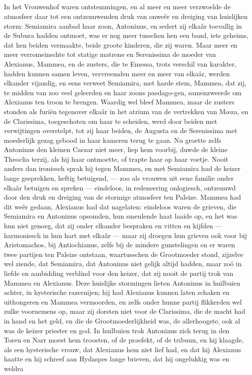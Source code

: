 \documentclass[a4paper, 12pt, oneside, dutch]{article}
\begin{document}
\subsection{}
\paragraph{}
In het Vrouwenhof waren ontstemmingen, en al meer en meer verzwoelde de atmosfeer daar tot een ontzenuwenden druk van onweêr en dreiging van huislijken storm: Semiamira aanbad haar zoon, Antoninus, en sedert zij elkaâr toevallig in de Subura hadden ontmoet, was er nog meer tusschen hen een band, iets geheims, dat hen beiden vermaakte, beide groote kinderen, die zij waren. Maar meer en meer verromeinschte tot statige matrone en Serenissima de moeder van Alexianus, Mammea, en de zusters, die te Emessa, trots verschil van karakter, hadden kunnen samen leven, vervreemden meer en meer van elkaâr, werden elkander vijandig, en eens verweet Semiamira, met harde stem, Mammea, dat zij, te midden van zoo veel geleerden en haar zoons paedago-gen, samenzweerde om Alexianus ten troon te brengen. Waardig wel bleef Mammea, maar de zusters stonden als furiën tegenover elkaâr in het atrium van de vertrekken van Mœza, en de Clarissima, toegeschoten om haar te scheiden, werd door beiden met verwijtingen overstelpt, tot zij haar beiden, de Augusta en de Serenissima met moederlijk gezag gebood in haar kameren terug te gaan. Nu groette zelfs Antoninus den kleinen Caezar niet meer, liep hem voorbij, duwde de kleine Theoclia terzij, als hij haar ontmoette, of trapte haar op haar voetje. Nooit anders dan ironiesch sprak hij tegen Mammea, en met Semiamira had de keizer lange gesprekken, heftig betuigend, --- zoo als vrouwen uit eene familie onder elkaâr betuigen en spreken --- eindeloos, in redeneering onlogiesch, ontzenuwd door den druk en dreiging van de stormige atmosfeer ten Paleize. Mammea had dit weêr gedaan, Alexianus had dat nagelaten: eindeloos waren de grieven, die Semiamira en Antoninus opsomden, hun smeulende haat laaide op, en het was hun niet genoeg, dat zij onder elkander bespraken en vitten en kijfden --- harmoniesch in hun hart met elkaâr --- maar zij droegen hun grieven ook voor bij Aristomachos, bij Antiochianus, zelfs bij de mindere gunstelingen en er waren twee partijen ten Paleize ontstaan, waartusschen de Grootmoeder stond, zijzelve wel ziende, dat Semiamira, dat Antoninus niet gelijk altijd hadden, maar zoó in liefde en aanbidding verblind voor den keizer, dat zij nooit de partij trok van Mammea en Alexianus. Deze huislijke stormingen lieten Antoninus in huilbuien achter, in hysterische razernijen; hij had Alexianus kunnen laten schaken en uithongeren en Mammea vermoorden, en zelfs onder hunne partij flikkerden wel zulke voornemens op, maar zij dorsten niet voor de Clarissima, die de macht had in hand en het geld, en die de Grootmoederlijkheid was, de allerhoogste, ook al was de keizer priester en god. In huilbuien trok Antoninus zich terug in den Toren en Narr moest hem troosten, of de praefekt, of de tribuun, en hij klaagde, als een hysterische vrouw, dat Alexianus hem niet lief had, en dat hij Alexianus haatte en hij schreef aan Hydaspes lange brieven, dat hij ongelukkig was en weldra 
\end{document}

